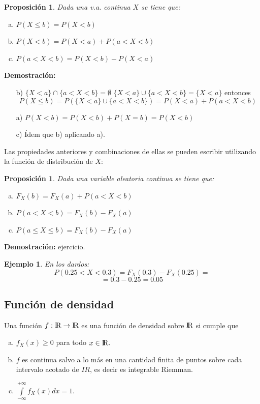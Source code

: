 \documentclass[12pt]{report}
\newtheorem{proposition}[definition]{Proposici\'on}
\newtheorem{example}[definition]{Ejemplo}
\def\R{I\!\!R}
\begin{document}
\begin{proposition}
    Dada una v.a. continua $X$ se tiene que:
\begin{enumerate}[a)]
    \item $P(X\leq b)=P(X<b)$
    \item $P(X<b)=P(X<a)+P(a<X<b)$
    \item $P(a<X<b)=P(X<b)-P(X<a)$
\end{enumerate}
\end{proposition}

\textbf{Demostración:}
\begin{itemize}
    \item[b)] $\{X<a\}\cap \{a<X<b\}=\emptyset$
$\{X<a\}\cup \{a<X<b\}=\{X<a\}$ entonces\newline
$$P(X\leq b)=P(\{X<a\}\cup \{a<X<b\})=P(X<a)+P(a<X<b)$$
    \item[a)] $P(X<b)=P(X<b)+P(X=b)=P(X<b)$
    \item[c)] \'Idem que b) aplicando a).
\end{itemize}

Las propiedades anteriores  y combinaciones de ellas se pueden
escribir utilizando la función de distribución de $X$:

\begin{proposition}Dada una variable aleatoria continua se tiene que:
    \begin{enumerate}[a)]
        \item $F_{X}(b)=F_{X}(a)+P(a<X<b)$
        \item $P(a<X<b)=F_{X}(b)-F_{X}(a)$
         \item $P(a\leq X\leq b)=F_{X}(b)-F_{X}(a)$
     \end{enumerate}
     \end{proposition}

    \textbf{Demostración:} ejercicio.

\begin{example}
    En los dardos:
    $$P(0.25<X<0.3)=F_{X}(0.3)-F_{X}(0.25)=$$
    $$=0.3-0.25=0.05$$
\end{example}

\subsection{Función de densidad}

Una función $f:\mbox{I\kern-.2em\hbox{R}}\to\mbox{I\kern-.2em\hbox{R}}$ es una función de densidad sobre $\mbox{I\kern-.2em\hbox{R}}$ si cumple que

\begin{enumerate}[a)]
\item $f_{X}(x)\geq 0$ para todo $x \in\mbox{I\kern-.2em\hbox{R}}.$
\item $f$ es continua salvo a lo más en una cantidad finita de puntos sobre
 cada intervalo acotado de $\R$, es decir es
integrable Riemman.
\item $\int\limits_{-\infty}^{+\infty} f_{X}(x) dx=1.$
\end{enumerate}
\end{document}
